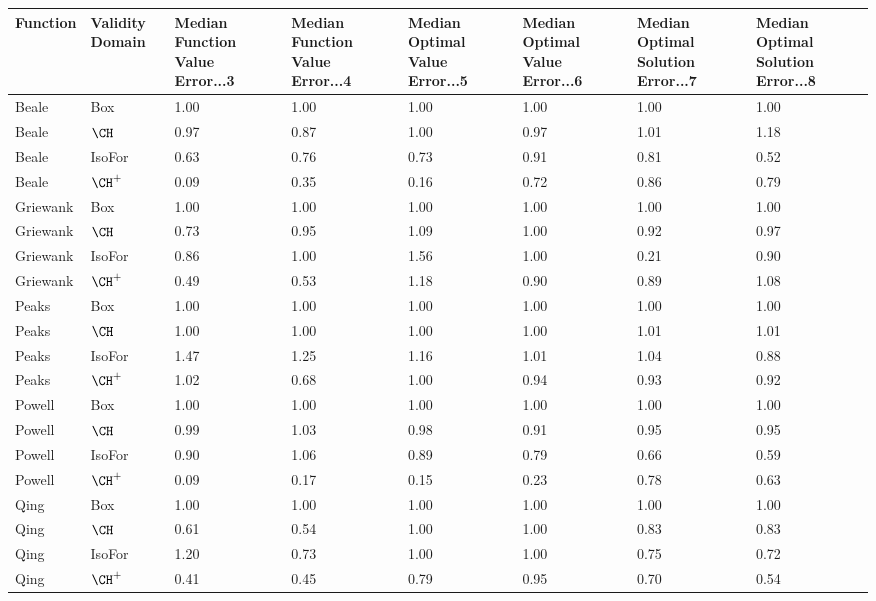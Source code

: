 \begin{table}[ht]
\centering
\begin{tabular}{llllllll}
  \hline
Function & Validity Domain & Median Function Value Error...3 & Median Function Value Error...4 & Median Optimal Value Error...5 & Median Optimal Value Error...6 & Median Optimal Solution Error...7 & Median Optimal Solution Error...8 \\ 
  \hline
Beale & {\sc Box} & 1.00 & 1.00 & 1.00 & 1.00 & 1.00 & 1.00 \\ 
  Beale & $\CH$ & 0.97 & 0.87 & 1.00 & 0.97 & 1.01 & 1.18 \\ 
  Beale & {\sc IsoFor} & 0.63 & 0.76 & 0.73 & 0.91 & 0.81 & 0.52 \\ 
  Beale & $\CH^+$ & 0.09 & 0.35 & 0.16 & 0.72 & 0.86 & 0.79 \\ 
  Griewank & {\sc Box} & 1.00 & 1.00 & 1.00 & 1.00 & 1.00 & 1.00 \\ 
  Griewank & $\CH$ & 0.73 & 0.95 & 1.09 & 1.00 & 0.92 & 0.97 \\ 
  Griewank & {\sc IsoFor} & 0.86 & 1.00 & 1.56 & 1.00 & 0.21 & 0.90 \\ 
  Griewank & $\CH^+$ & 0.49 & 0.53 & 1.18 & 0.90 & 0.89 & 1.08 \\ 
  Peaks & {\sc Box} & 1.00 & 1.00 & 1.00 & 1.00 & 1.00 & 1.00 \\ 
  Peaks & $\CH$ & 1.00 & 1.00 & 1.00 & 1.00 & 1.01 & 1.01 \\ 
  Peaks & {\sc IsoFor} & 1.47 & 1.25 & 1.16 & 1.01 & 1.04 & 0.88 \\ 
  Peaks & $\CH^+$ & 1.02 & 0.68 & 1.00 & 0.94 & 0.93 & 0.92 \\ 
  Powell & {\sc Box} & 1.00 & 1.00 & 1.00 & 1.00 & 1.00 & 1.00 \\ 
  Powell & $\CH$ & 0.99 & 1.03 & 0.98 & 0.91 & 0.95 & 0.95 \\ 
  Powell & {\sc IsoFor} & 0.90 & 1.06 & 0.89 & 0.79 & 0.66 & 0.59 \\ 
  Powell & $\CH^+$ & 0.09 & 0.17 & 0.15 & 0.23 & 0.78 & 0.63 \\ 
  Qing & {\sc Box} & 1.00 & 1.00 & 1.00 & 1.00 & 1.00 & 1.00 \\ 
  Qing & $\CH$ & 0.61 & 0.54 & 1.00 & 1.00 & 0.83 & 0.83 \\ 
  Qing & {\sc IsoFor} & 1.20 & 0.73 & 1.00 & 1.00 & 0.75 & 0.72 \\ 
  Qing & $\CH^+$ & 0.41 & 0.45 & 0.79 & 0.95 & 0.70 & 0.54 \\ 

\end{tabular}
\end{table}
